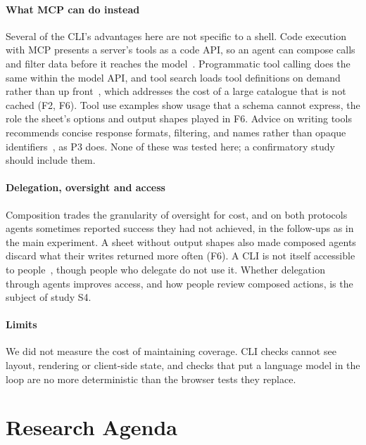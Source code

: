 \documentclass[sigconf,nonacm]{acmart}
\begin{document}
\paragraph{What MCP can do instead}
Several of the CLI's advantages here are not specific to a shell. Code execution with MCP presents a server's tools as a code API, so an agent can compose calls and filter data before it reaches the model~\cite{anthropic2025codeexec,cloudflare2025codemode}. Programmatic tool calling does the same within the model API, and tool search loads tool definitions on demand rather than up front~\cite{anthropic2025advancedtools}, which addresses the cost of a large catalogue that is not cached (F2, F6). Tool use examples show usage that a schema cannot express, the role the sheet's options and output shapes played in F6. Advice on writing tools recommends concise response formats, filtering, and names rather than opaque identifiers~\cite{anthropic2025writingtools}, as P3 does. None of these was tested here; a confirmatory study should include them.

\paragraph{Delegation, oversight and access}
Composition trades the granularity of oversight for cost, and on both protocols agents sometimes reported success they had not achieved, in the follow-ups as in the main experiment. A sheet without output shapes also made composed agents discard what their writes returned more often (F6). A CLI is not itself accessible to people~\cite{sampath2021accessibility}, though people who delegate do not use it. Whether delegation through agents improves access, and how people review composed actions, is the subject of study S4.

\paragraph{Limits}
We did not measure the cost of maintaining coverage. CLI checks cannot see layout, rendering or client-side state, and checks that put a language model in the loop are no more deterministic than the browser tests they replace.


\section{Research Agenda}
\label{sec:agenda}
\end{document}
